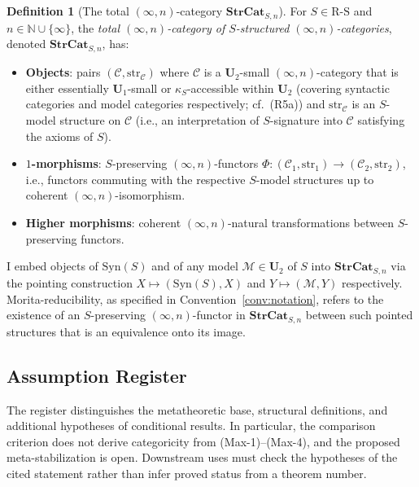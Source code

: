 \documentclass[11pt]{article}
\theoremstyle{plain}
\theoremstyle{definition}
\newtheorem{definition}[theorem]{Definition}
\newcommand{\RS}{\mathrm{R\text{-}S}}
\newcommand{\cM}{\mathcal{M}}
\newcommand{\cC}{\mathcal{C}}
\newcommand{\Syn}{\mathrm{Syn}}
\begin{document}
\begin{definition}[The total $(\infty, n)$-category $\mathbf{StrCat}_{S, n}$]\label{def:strcat}
For $S \in \RS$ and $n \in \mathbb{N} \cup \{\infty\}$, the \emph{total $(\infty, n)$-category of $S$-structured $(\infty, n)$-categories}, denoted $\mathbf{StrCat}_{S, n}$, has:
\begin{itemize}
\item \textbf{Objects}: pairs $(\cC, \mathrm{str}_\cC)$ where $\cC$ is a $\mathbf{U}_2$-small $(\infty, n)$-category that is either essentially $\mathbf{U}_1$-small or $\kappa_S$-accessible within $\mathbf{U}_2$ (covering syntactic categories and model categories respectively; cf.\ (R5a)) and $\mathrm{str}_\cC$ is an $S$-model structure on $\cC$ (i.e., an interpretation of $S$-signature into $\cC$ satisfying the axioms of $S$).
\item \textbf{$1$-morphisms}: $S$-preserving $(\infty, n)$-functors $\Phi : (\cC_1, \mathrm{str}_1) \to (\cC_2, \mathrm{str}_2)$, i.e., functors commuting with the respective $S$-model structures up to coherent $(\infty, n)$-isomorphism.
\item \textbf{Higher morphisms}: coherent $(\infty, n)$-natural transformations between $S$-preserving functors.
\end{itemize}
I embed objects of $\Syn(S)$ and of any model $\cM \in \mathbf{U}_2$ of $S$ into $\mathbf{StrCat}_{S, n}$ via the pointing construction $X \mapsto (\Syn(S), X)$ and $Y \mapsto (\cM, Y)$ respectively. Morita-reducibility, as specified in Convention~\ref{conv:notation}, refers to the existence of an $S$-preserving $(\infty, n)$-functor in $\mathbf{StrCat}_{S, n}$ between such pointed structures that is an equivalence onto its image.
\end{definition}

\subsection{Assumption Register}\label{sec:assumption-register}

The register distinguishes the metatheoretic base, structural definitions, and additional hypotheses of conditional results. In particular, the comparison criterion does not derive categoricity from (Max-1)--(Max-4), and the proposed meta-stabilization is open. Downstream uses must check the hypotheses of the cited statement rather than infer proved status from a theorem number.
\end{document}
